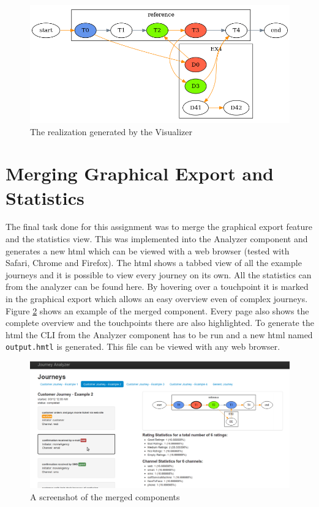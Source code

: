 \documentclass[12pt]{scrartcl}
\begin{document}
\begin{figure}[hbtp]
	\centering
	\includegraphics[scale=0.5]{img/sample_journey2.png}
	\caption{The realization generated by the Visualizer}
	\label{figure:sample_figure2}
\end{figure}

\section{Merging Graphical Export and Statistics}
\label{section:merge}

The final task done for this assignment was to merge the graphical export feature and the statistics view. This was
implemented into the Analyzer component and generates a new html which can be viewed with a web browser (tested
with Safari, Chrome and Firefox). The html shows a tabbed view of all the example journeys and it is possible to view
every journey on its own. All the statistics can from the analyzer can be found here. By hovering over a touchpoint
it is marked in the graphical export which allows an easy overview even of complex journeys. 
Figure \ref{figure:merge_figure} shows an example of the merged component. Every page also shows the complete overview
and the touchpoints there are also highlighted. To generate the html the CLI from the Analyzer component has to be run
and a new html named \lstinline!output.hmtl! is generated. This file can be viewed with any web browser.

\begin{figure}[hbtp]
	\centering
	\includegraphics[scale=0.35]{img/merge_sample1.png}
	\caption{A screenshot of the merged components}
	\label{figure:merge_figure}
\end{figure}
\end{document}
